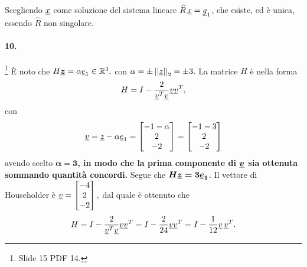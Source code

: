 \addtocounter{footnote}{-1}


\noindent Scegliendo $\uline{x}$ come soluzione del sistema lineare $\widehat{R}\,\uline x=\uline g_1$, che esiste, ed è unica, essendo $\widehat{R}$ non singolare.

\paragraph{10.}\footnote{Slide 15 PDF 14.} È noto che $H\boldsymbol{\uline z}=\alpha\uline e_1\in\mathbb R^3, $ con $\alpha=\pm\left|\left|\uline z\right|\right|_2=\pm 3.$ La matrice $H$ è nella forma
\begin{equation*}
    H=I-\frac{2}{\uline v^T\uline v}\uline v\uline v^T,
\end{equation*}
con
\begin{equation*}
    \uline v=\uline z-\alpha \uline e_1=
    \begin{bmatrix}
        -1-\alpha\\
        2\\
        -2
    \end{bmatrix}=
    \begin{bmatrix}
        -1-3\\
        2\\
        -2
    \end{bmatrix}
\end{equation*}
avendo scelto \textbf{$\boldsymbol{\alpha=3}$, in modo che la prima componente di $\boldsymbol{\uline v}$ sia ottenuta sommando quantità concordi.} Segue che $\boldsymbol{H\uline z= 3\uline e_1}$. Il vettore di Householder è $\uline v=\begin{bmatrix}
    -4\\
    2\\
    -2
\end{bmatrix},$ dal quale è ottenuto che
\begin{equation*}
    H=I-\frac{2}{\uline v^T\uline v}\uline v\uline v^T=I-\frac{2}{24}\uline v \uline v^T=I-\frac{1}{12}\uline v\, \uline v^T.
\end{equation*}

